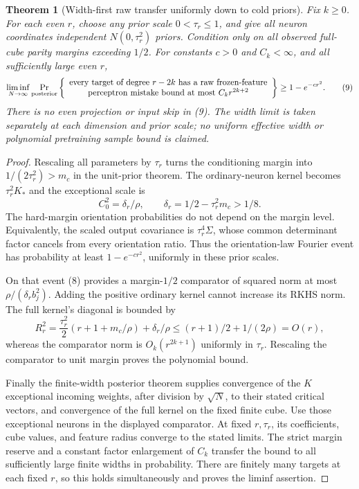 \documentclass[11pt]{article}
\newtheorem{theorem}{Theorem}\newtheorem{lemma}[theorem]{Lemma}
\begin{document}
\begin{theorem}[Width-first raw transfer uniformly down to cold priors]
Fix $k\ge0$. For each even $r$, choose any prior scale $0<\tau_r\le1$,
and give all neuron coordinates independent $N(0,\tau_r^2)$ priors.
Condition only on all observed full-cube parity margins exceeding $1/2$.
For constants $c>0$ and $C_k<\infty$, and all sufficiently large even $r$,
\[
 \liminf_{N\to\infty}\Pr_{\rm posterior}\left\{
 \begin{array}{c}
 \text{every target of degree }r-2k\text{ has a raw frozen-feature}\\
 \text{perceptron mistake bound at most }C_k r^{2k+2}
 \end{array}\right\}\ge1-e^{-cr^2}.                    \tag{9}
\]
There is no even projection or input skip in (9).
The width limit is taken separately at each dimension and prior scale;
no uniform effective width or polynomial pretraining sample bound is claimed.
\end{theorem}
\begin{proof}
Rescaling all parameters by $\tau_r$ turns the conditioning margin into
$1/(2\tau_r^2)>m_c$ in the unit-prior theorem. The ordinary-neuron
kernel becomes $\tau_r^2K_*$ and the exceptional scale is
\[
 C_0^2=\delta_r/\rho,\qquad
 \delta_r=1/2-\tau_r^2m_c>1/8.
\]
The hard-margin orientation probabilities do not depend on the margin
level. Equivalently, the scaled output covariance is $\tau_r^4\Sigma$,
whose common determinant factor cancels from every orientation ratio.
Thus the orientation-law Fourier event has probability at least
$1-e^{-cr^2}$, uniformly in these prior scales.

On that event (8) provides a margin-$1/2$ comparator of squared norm at
most $\rho/(\delta_rb_j^2)$. Adding the positive ordinary kernel cannot
increase its RKHS norm. The full kernel's diagonal is bounded by
\[
 R_r^2=\frac{\tau_r^2}{2}(r+1+m_c/\rho)+\delta_r/\rho
       \le(r+1)/2+1/(2\rho)=O(r),
\]
whereas the comparator norm is $O_k(r^{2k+1})$ uniformly in $\tau_r$.
Rescaling the comparator to unit margin proves the polynomial bound.

Finally the finite-width posterior theorem supplies convergence of the
$K$ exceptional incoming weights, after division by $\sqrt N$, to their
stated critical vectors, and convergence of the full kernel on the fixed
finite cube. Use those exceptional neurons in the displayed comparator.
At fixed $r,\tau_r$, its coefficients, cube values, and feature radius
converge to the stated limits. The strict margin reserve and a constant
factor enlargement of $C_k$ transfer the bound to all sufficiently large
finite widths in probability. There are finitely many targets at each
fixed $r$, so this holds simultaneously and proves the liminf assertion.
\end{proof}
\end{document}
